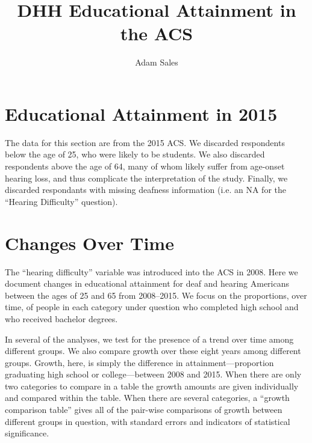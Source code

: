 \documentclass{article}\usepackage[]{graphicx}\usepackage[]{color}
\title{DHH Educational Attainment in the ACS}
\author{Adam Sales}
\begin{document}
\maketitle



\section{Educational Attainment in 2015}
The data for this section are from the 2015 ACS.
We discarded respondents below the age of 25, who were likely to be
students.
We also discarded respondents above the age of 64, many of whom likely
suffer from age-onset hearing loss, and thus complicate the
interpretation of the study.
Finally, we discarded %
respondants with missing
deafness information (i.e. an NA for the ``Hearing Difficulty''
question).



\clearpage
\section{Changes Over Time}
The ``hearing difficulty'' variable was introduced into the ACS in
2008.
Here we document changes in educational attainment for deaf and
hearing Americans between the ages of 25 and 65 from 2008--2015.
We focus on the proportions, over time, of people in each category under question
who completed high school and who received bachelor degrees.

In several of the analyses, we test for the presence of a trend over
time among different groups.
We also compare growth over these eight years among different groups.
Growth, here, is simply the difference in attainment---proportion
graduating high school or college---between 2008 and 2015.
When there are only two categories to compare in a table the growth
amounts are given individually and compared within the table.
When there are several categories, a ``growth comparison table'' gives
all of the pair-wise comparisons of growth between different groups in
question, with standard errors and indicators of statistical
significance.


\clearpage
\end{document}
